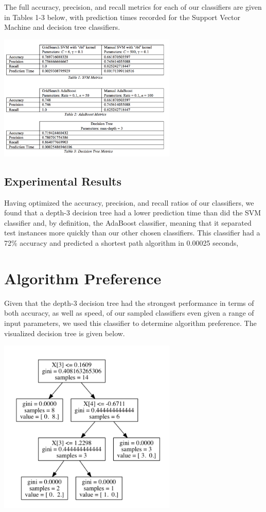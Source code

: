 \documentclass{article}
\begin{document}
The full accuracy, precision, and recall metrics for each of our classifiers are given in Tables 1-3 below, with prediction times recorded for the Support Vector Machine and decision tree classifiers.

\includegraphics[width=8.5cm]{tables}

\subsection{Experimental Results}

Having optimized the accuracy, precision, and recall ratios of our classifiers, we found that a depth-3 decision tree had a lower prediction time than did the SVM classifier and, by definition, the AdaBoost classifier, meaning that it separated test instances more quickly than our other chosen classifiers. This classifier had a 72\% accuracy and predicted a shortest path algorithm in 0.00025 seconds, 

\section{Algorithm Preference}

Given that the depth-3 decision tree had the strongest performance in terms of both accuracy, as well as speed, of our sampled classifiers even given a range of input parameters, we used this classifier to determine algorithm preference. The visualized decision tree is given below. 

\includegraphics[width=8.5cm]{dtree_vis}
\end{document}
